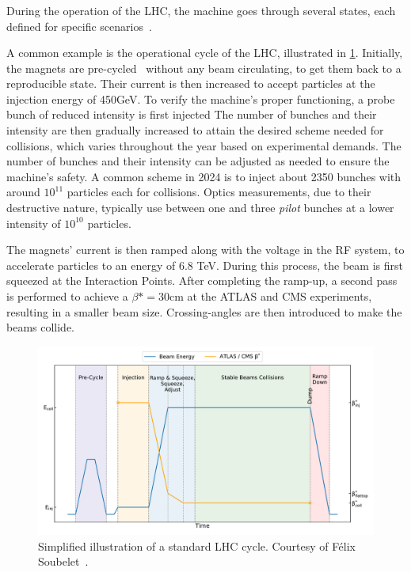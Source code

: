 \subsubsection{}

During the operation of the LHC, the machine goes through several states, each defined for specific 
scenarios~\cite{wenniger_lhc_2019}.

A common example is the operational cycle of the LHC, illustrated in \cref{fig:cern_complex:cycle}.
Initially, the magnets are pre-cycled~\cite{bottura_pre-cycles_2010} without any beam circulating,
to get them back to a reproducible state. Their current is then increased to accept particles at the
injection energy of 450GeV.  To verify the machine's proper functioning, a probe bunch of reduced
intensity is first injected The number of bunches and their intensity are then gradually increased
to attain the desired scheme needed for collisions, which varies throughout the year based on
experimental demands. The number of bunches and their intensity can be adjusted as needed to ensure
the machine's safety. A common scheme in 2024 is to inject about 2350 bunches with around $10^{11}$
particles each for collisions.  Optics measurements, due to their destructive nature, typically use
between one and three \textit{pilot} bunches at a lower intensity of $10^{10}$ particles.

The magnets' current is then ramped along with the voltage in the RF system, to accelerate particles
to an energy of 6.8 TeV. During this process, the beam is first squeezed at the Interaction Points.
After completing the ramp-up, a second pass is performed to achieve a $\beta* = 30$cm at the ATLAS
and CMS experiments, resulting in a smaller beam size. Crossing-angles are then introduced to make
the beams collide.

\begin{figure}[!htb]
    \includegraphics[width=\textwidth]{./images/lhc_cycle.pdf}
    \caption{Simplified illustration of a standard LHC cycle. Courtesy of Félix
    Soubelet~\cite{felix_soubelet_local_2023}.}
    \label{fig:cern_complex:cycle}
\end{figure}


